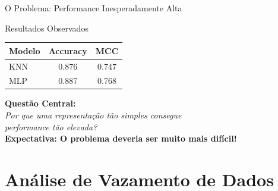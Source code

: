 \documentclass[aspectratio=169,11pt]{beamer}
\begin{document}
\begin{frame}{O Problema: Performance Inesperadamente Alta}
    \begin{alertblock}{Resultados Observados}
        \centering
        \begin{tabular}{lcc}
            \toprule
            \textbf{Modelo} & \textbf{Accuracy} & \textbf{MCC} \\
            \midrule
            KNN & 0.876 & 0.747 \\
            MLP & 0.887 & 0.768 \\
            \bottomrule
        \end{tabular}
    \end{alertblock}

    \vspace{0.5cm}
    \begin{center}
        \Large\textcolor{alertred}{\textbf{Questão Central:}}\\[0.3cm]
        \textit{Por que uma representação tão simples consegue\\performance tão elevada?}\\[0.5cm]
        \textcolor{warningorange}{\textbf{Expectativa: O problema deveria ser muito mais difícil!}}
    \end{center}
\end{frame}

\section{Análise de Vazamento de Dados}
\end{document}
